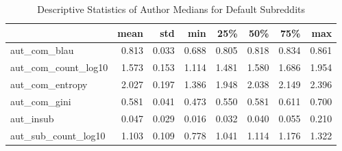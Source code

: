 \begin{table}
\centering
\begin{tabular}{lrrrrrrr}
\toprule
{} &  mean &   std &   min &   25\% &   50\% &   75\% &   max \\
\midrule
aut\_com\_blau        & 0.813 & 0.033 & 0.688 & 0.805 & 0.818 & 0.834 & 0.861 \\
aut\_com\_count\_log10 & 1.573 & 0.153 & 1.114 & 1.481 & 1.580 & 1.686 & 1.954 \\
aut\_com\_entropy     & 2.027 & 0.197 & 1.386 & 1.948 & 2.038 & 2.149 & 2.396 \\
aut\_com\_gini        & 0.581 & 0.041 & 0.473 & 0.550 & 0.581 & 0.611 & 0.700 \\
aut\_insub           & 0.047 & 0.029 & 0.016 & 0.032 & 0.040 & 0.055 & 0.210 \\
aut\_sub\_count\_log10 & 1.103 & 0.109 & 0.778 & 1.041 & 1.114 & 1.176 & 1.322 \\
\bottomrule
\end{tabular}
\caption{Descriptive Statistics of Author Medians for Default Subreddits}
\label{table/author-medians:defaults}
\end{table}